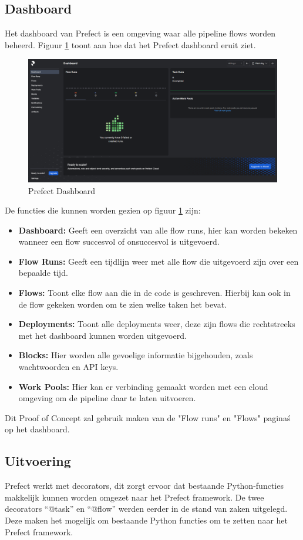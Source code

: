 \subsection{Dashboard}
Het dashboard van Prefect is een omgeving waar alle pipeline flows worden beheerd. Figuur \ref{fig:Prefect_Dashboard} toont aan hoe dat het Prefect dashboard eruit ziet.
\begin{figure}[htbp]
    \includegraphics[width=\linewidth]{graphics/Prefect_dashboard.PNG}
    \caption{Prefect Dashboard}
    \label{fig:Prefect_Dashboard}
\end{figure}
De functies die kunnen worden gezien op figuur \ref{fig:Prefect_Dashboard} zijn:
\begin{itemize}
    \item \textbf{Dashboard:} Geeft een overzicht van alle flow runs, hier kan worden bekeken wanneer een flow succesvol of onsuccesvol is uitgevoerd.
    \item \textbf{Flow Runs:} Geeft een tijdlijn weer met alle flow die uitgevoerd zijn over een bepaalde tijd.
    \item \textbf{Flows:} Toont elke flow aan die in de code is geschreven. Hierbij kan ook in de flow gekeken worden om te zien welke taken het bevat.
    \item \textbf{Deployments:} Toont alle deployments weer, deze zijn flows die rechtstreeks met het dashboard kunnen worden uitgevoerd.
    \item \textbf{Blocks:} Hier worden alle gevoelige informatie bijgehouden, zoals wachtwoorden en API keys.
    \item \textbf{Work Pools:} Hier kan er verbinding gemaakt worden met een cloud omgeving om de pipeline daar te laten uitvoeren.
\end{itemize}
Dit Proof of Concept zal gebruik maken van de "Flow runs" en "Flows" pagina\'s op het dashboard.
\subsection{Uitvoering}
Prefect werkt met decorators, dit zorgt ervoor dat bestaande Python-functies makkelijk kunnen worden omgezet naar het Prefect framework. De twee decorators ``@task'' en ``@flow'' werden eerder in de stand van zaken uitgelegd. Deze maken het mogelijk om bestaande Python functies om te zetten naar het Prefect framework.

